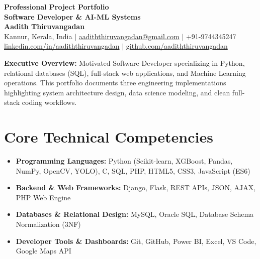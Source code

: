 \documentclass[11pt,letterpaper]{article}
\begin{document}
\begin{center}
    \vspace*{0.5in}
    {\Huge \bfseries \color{SlateBlue} Professional Project Portfolio} \\[0.1in]
    {\large \bfseries \color{gray} Software Developer \& AI-ML Systems} \\[0.4in]
    
    {\Huge \bfseries Aadith Thiruvangadan} \\[0.2in]
    
    \small Kannur, Kerala, India $|$ \href{mailto:aadiththiruvangadan@gmail.com}{aadiththiruvangadan@gmail.com} $|$ +91-9744345247 \\
    \small \href{https://linkedin.com/in/aadiththiruvangadan}{linkedin.com/in/aadiththiruvangadan} $|$ \href{https://github.com/aadiththiruvangadan}{github.com/aadiththiruvangadan} \\
    \vspace*{0.5in}
\end{center}

\begin{highlightbox}
    \textbf{Executive Overview:} Motivated Software Developer specializing in Python, relational databases (SQL), full-stack web applications, and Machine Learning operations. This portfolio documents three engineering implementations highlighting system architecture design, data science modeling, and clean full-stack coding workflows.
\end{highlightbox}

\vspace{0.2in}

\section{Core Technical Competencies}
\begin{itemize}[leftmargin=0.2in]
    \item \textbf{Programming Languages:} Python (Scikit-learn, XGBoost, Pandas, NumPy, OpenCV, YOLO), C, SQL, PHP, HTML5, CSS3, JavaScript (ES6)
    \item \textbf{Backend \& Web Frameworks:} Django, Flask, REST APIs, JSON, AJAX, PHP Web Engine
    \item \textbf{Databases \& Relational Design:} MySQL, Oracle SQL, Database Schema Normalization (3NF)
    \item \textbf{Developer Tools \& Dashboards:} Git, GitHub, Power BI, Excel, VS Code, Google Maps API
\end{itemize}
\end{document}
